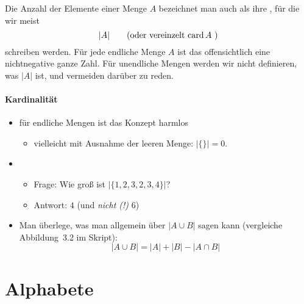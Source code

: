 Die Anzahl der Elemente einer Menge $A$ bezeichnet man auch als ihre
, für die wir meist
\[
  |A| \text{\qquad (oder vereinzelt  $\mathop{\mathrm{card}} A$ )}
\]
schreiben werden.
%
Für jede endliche Menge $A$ ist das offensichtlich eine nichtnegative
ganze Zahl.
%
Für unendliche Mengen werden wir nicht definieren, was $|A|$ ist, und
vermeiden darüber zu reden.

\begin{tutorium}
  \paragraph{Kardinalität}

  \begin{itemize}
  \item für endliche Mengen ist das Konzept harmlos
    \begin{itemize}
    \item vielleicht mit Ausnahme der leeren Menge: $|\{\}|=0$.
    \end{itemize}
  \item
    \begin{itemize}
    \item Frage: Wie groß ist $|\{1,2,3,2,3,4\}|$?
    \item Antwort: $4$ (und \emph{nicht (!)} $6$)
    \end{itemize}
  \item Man überlege, was man allgemein über $|A\cup B|$ sagen kann
    (vergleiche Abbildung~3.2 im Skript):
    \[
      |A\cup B| = |A| + |B| - |A\cap B|
    \]
  \end{itemize}
\end{tutorium}

\Tut\section{Alphabete}
\label{subsec:alphabete}

